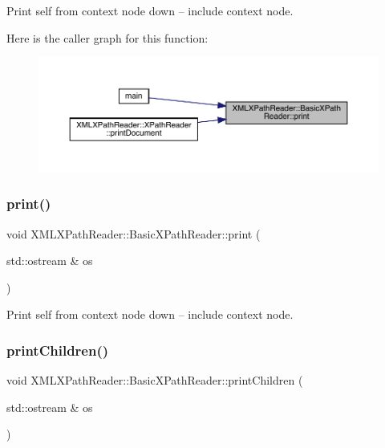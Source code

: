 Print self from context node down -- include context node. 

Here is the caller graph for this function\+:\nopagebreak
\begin{figure}[H]
\begin{center}
\leavevmode
\includegraphics[width=350pt]{d6/dbf/classXMLXPathReader_1_1BasicXPathReader_a846e0ac9b2835040cb615a9585e2a999_icgraph}
\end{center}
\end{figure}
\mbox{\label{classXMLXPathReader_1_1BasicXPathReader_a846e0ac9b2835040cb615a9585e2a999}} 
\subsubsection{\texorpdfstring{print()}{print()}\hspace{0.1cm}{\footnotesize\ttfamily [2/2]}}
{\footnotesize\ttfamily void X\+M\+L\+X\+Path\+Reader\+::\+Basic\+X\+Path\+Reader\+::print (\begin{DoxyParamCaption}\item[{std\+::ostream \&}]{os }\end{DoxyParamCaption})}



Print self from context node down -- include context node. 

\mbox{\label{classXMLXPathReader_1_1BasicXPathReader_a980f4e08d97855479d47e5b10205075e}} 
\subsubsection{\texorpdfstring{printChildren()}{printChildren()}\hspace{0.1cm}{\footnotesize\ttfamily [1/2]}}
{\footnotesize\ttfamily void X\+M\+L\+X\+Path\+Reader\+::\+Basic\+X\+Path\+Reader\+::print\+Children (\begin{DoxyParamCaption}\item[{std\+::ostream \&}]{os }\end{DoxyParamCaption})}



